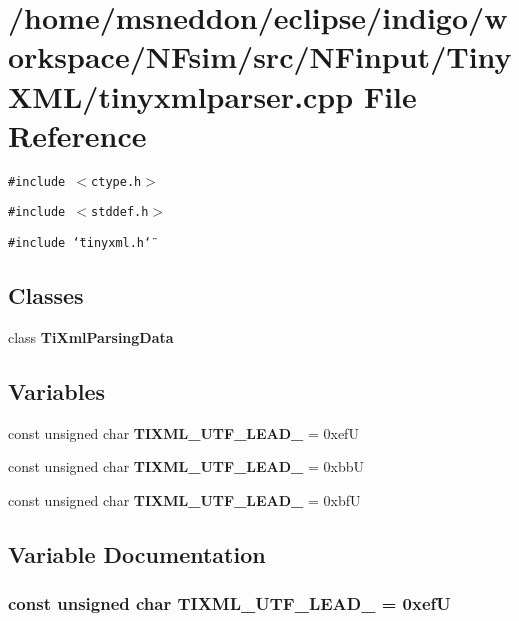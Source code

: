 \section{/home/msneddon/eclipse/indigo/workspace/NFsim/src/NFinput/TinyXML/tinyxmlparser.cpp File Reference}
\label{tinyxmlparser_8cpp}


{\tt \#include $<$ctype.h$>$}\par
{\tt \#include $<$stddef.h$>$}\par
{\tt \#include \char`\"{}tinyxml.h\char`\"{}}\par
\subsection*{Classes}
\begin{CompactItemize}
\item 
class {\bf TiXmlParsingData}
\end{CompactItemize}
\subsection*{Variables}
\begin{CompactItemize}
\item 
const unsigned char {\bf TIXML\_\-UTF\_\-LEAD\_} = 0xefU
\item 
const unsigned char {\bf TIXML\_\-UTF\_\-LEAD\_} = 0xbbU
\item 
const unsigned char {\bf TIXML\_\-UTF\_\-LEAD\_} = 0xbfU
\end{CompactItemize}


\subsection{Variable Documentation}
\subsubsection{\setlength{\rightskip}{0pt plus 5cm}const unsigned char {\bf TIXML\_\-UTF\_\-LEAD\_} = 0xefU}\label{tinyxmlparser_8cpp_37999e32163e2a3280bc0b8e1999774e}


